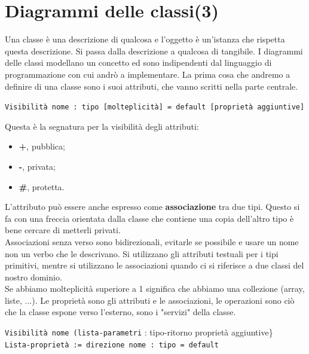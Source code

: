 




\section{Diagrammi delle classi(3)}

Una classe è una descrizione di qualcosa e l'oggetto è un'istanza che rispetta questa descrizione. Si passa dalla descrizione a qualcosa di tangibile. I diagrammi delle classi modellano un concetto ed sono indipendenti dal linguaggio di programmazione con cui andrò a implementare. La prima cosa che andremo a definire di una classe sono i suoi attributi, che vanno scritti nella parte centrale.

\begin{center}

\texttt{Visibilità nome : tipo [molteplicità] = default [proprietà aggiuntive]}

\end{center}

Questa è la segnatura per la visibilità degli attributi:

\begin{itemize}

	\item \textbf{+}, pubblica;
	\item \textbf{-}, privata;
	\item \textbf{\#}, protetta.

\end{itemize}

L'attributo può essere anche espresso come \textbf{associazione} tra due tipi. Questo si fa con una freccia orientata dalla classe che contiene una copia dell'altro tipo è bene cercare di metterli privati.\\
Associazioni senza verso sono bidirezionali, evitarle se possibile e usare un nome non un verbo che le descrivano. Si utilizzano gli attributi testuali per i tipi primitivi, mentre si utilizzano le associazioni quando ci si riferisce a due classi del nostro dominio.\\
Se abbiamo molteplicità superiore a 1 significa che abbiamo una collezione (array, liste, ...). Le proprietà sono gli attributi e le associazioni, le operazioni sono ciò che la classe espone verso l'esterno, sono i "servizi" della classe.

\begin{center}

\texttt{Visibilità nome (lista-parametri} : tipo-ritorno {proprietà aggiuntive\}}\\
\texttt{Lista-proprietà := direzione nome : tipo = default}

\end{center}


